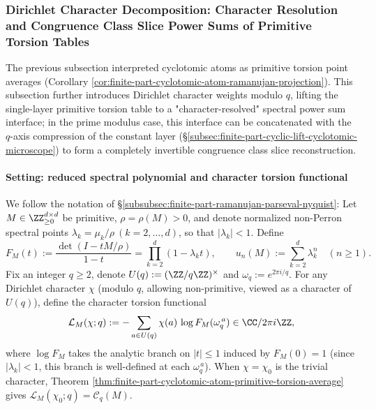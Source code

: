 
\subsubsection{Dirichlet Character Decomposition: Character Resolution and Congruence Class Slice Power Sums of Primitive Torsion Tables}\label{subsubsec:finite-part-dirichlet-character-torsion-spectral-slices}
The previous subsection interpreted cyclotomic atoms as primitive torsion point averages (Corollary \ref{cor:finite-part-cyclotomic-atom-ramanujan-projection}).
This subsection further introduces Dirichlet character weights modulo \(q\), lifting the single-layer primitive torsion table to a "character-resolved" spectral power sum interface;
in the prime modulus case, this interface can be concatenated with the \(q\)-axis compression of the constant layer (\S\ref{subsec:finite-part-cyclic-lift-cyclotomic-microscope}) to form a completely invertible congruence class slice reconstruction.

\paragraph{Setting: reduced spectral polynomial and character torsion functional}
We follow the notation of \S\ref{subsubsec:finite-part-ramanujan-parseval-nyquist}:
Let \(M\in\ZZ_{\ge0}^{d\times d}\) be primitive, \(\rho=\rho(M)>0\), and denote normalized non-Perron spectral points \(\lambda_k=\mu_k/\rho\ (k=2,\dots,d)\), so that \(|\lambda_k|<1\).
Define
\[
F_M(t):=\frac{\det(I-tM/\rho)}{1-t}=\prod_{k=2}^{d}(1-\lambda_k t),
\qquad
u_n(M):=\sum_{k=2}^{d}\lambda_k^{n}\quad(n\ge1).
\]
Fix an integer \(q\ge2\), denote \(U(q):=(\ZZ/q\ZZ)^\times\) and \(\omega_q:=e^{2\pi i/q}\).
For any Dirichlet character \(\chi\) (modulo \(q\), allowing non-primitive, viewed as a character of \(U(q)\)), define the character torsion functional
\[
\mathcal{L}_M(\chi;q):=-\sum_{a\in U(q)}\chi(a)\,\log F_M(\omega_q^{\,a})\in\CC/2\pi i\ZZ,
\]
where \(\log F_M\) takes the analytic branch on \(|t|\le1\) induced by \(F_M(0)=1\) (since \(|\lambda_k|<1\), this branch is well-defined at each \(\omega_q^{\,a}\)).
When \(\chi=\chi_0\) is the trivial character, Theorem \ref{thm:finite-part-cyclotomic-atom-primitive-torsion-average} gives \(\mathcal{L}_M(\chi_0;q)=\mathcal{C}_q(M)\).

